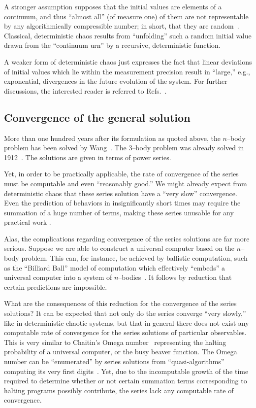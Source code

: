 \documentclass[rmp,amsfonts,showpacs,showkeys,twocolumn]{revtex4}
\begin{document}
A stronger assumption supposes that the initial values are elements of
a continuum, and thus ``almost all'' (of measure one) of them
are not representable by any algorithmically compressible number;
in short, that they are random~\cite{calude:02}.
Classical, deterministic chaos results from ``unfolding'' such a random initial value
drawn from the ``continuum urn'' by a recursive, deterministic function.

A weaker form of deterministic chaos just expresses the fact
that linear deviations of initial values which lie within the measurement precision
result in ``large,'' e.g., exponential, divergences in the future evolution of the system.
For further discussions, the interested reader is referred to
Refs.~\cite{shaw,crutchFaPaShaw,schuster1,bricmont,Crutchfield90}.


\subsection{Convergence of the general solution}

More than one hundred years after its formulation as quoted above,
the $n$--body problem has been solved by Wang~\cite{Wang91,Diacu96,Wang01}.
The $3$--body problem was already solved in 1912~\cite{Sundman12}.
The solutions are given in terms of power series.

Yet, in order to be practically applicable,
the rate of convergence of the series must be computable and even ``reasonably good.''
We might already expect from deterministic chaos
that these series solution have a ``very slow'' convergence.
Even the prediction of behaviors in insignificantly short times
may require the summation of a huge number of terms,
making these series unusable for any practical work
\cite{Diacu96}.

Alas, the complications regarding convergence of the series solutions are far more serious.
Suppose we are able to construct a universal computer based on the $n$--body problem.
This can, for instance, be achieved by ballistic computation, such as the
``Billiard Ball'' model of computation
\cite{fred-tof-82,margolus-02}
which effectively ``embeds'' a universal computer into a system of $n$--bodies~\cite{svozil-2007-cestial}.
It follows by reduction that certain predictions are impossible.

What are the consequences of this reduction for the convergence of the series solutions?
It can be expected that not only do the series converge ``very slowly,''
like in deterministic chaotic systems,
but that in general there does not exist any computable rate of convergence
for the series solutions of particular observables.
This is very similar to Chaitin's Omega number~\cite{chaitin3,calude:02}
representing the halting probability of a universal computer, or the busy beaver function.
The Omega number can be ``enumerated''
by series solutions from ``quasi-algorithms''
computing its very first digits~\cite{calude-dinneen06}.
Yet, due to the incomputable growth of the time
required to determine whether or not certain summation terms corresponding to halting programs possibly contribute,
the series lack any computable rate of convergence.
\end{document}
